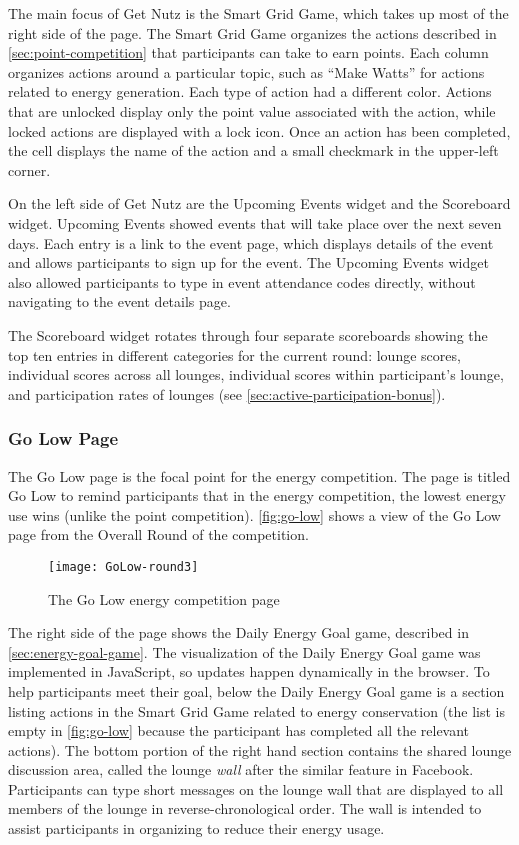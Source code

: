 The main focus of Get Nutz is the Smart Grid Game, which takes up most of the right side of the page. The Smart Grid Game organizes the actions described in \autoref{sec:point-competition} that participants can take to earn points. Each column organizes actions around a particular topic, such as ``Make Watts'' for actions related to energy generation. Each type of action had a different color. Actions that are unlocked display only the point value associated with the action, while locked actions are displayed with a lock icon. Once an action has been completed, the cell displays the name of the action and a small checkmark in the upper-left corner.

On the left side of Get Nutz are the Upcoming Events widget and the Scoreboard widget. Upcoming Events showed events that will take place over the next seven days. Each entry is a link to the event page, which displays details of the event and allows participants to sign up for the event. The Upcoming Events widget also allowed participants to type in event attendance codes directly, without navigating to the event details page.

The Scoreboard widget rotates through four separate scoreboards showing the top ten entries in different categories for the current round: lounge scores, individual scores across all lounges, individual scores within participant's lounge, and participation rates of lounges (see \autoref{sec:active-participation-bonus}).


\subsubsection{Go Low Page}

The Go Low page is the focal point for the energy competition. The page is titled Go Low to remind participants that in the energy competition, the lowest energy use wins (unlike the point competition). \autoref{fig:go-low} shows a view of the Go Low page from the Overall Round of the competition.

\begin{figure}[htbp]
	\centering
		\texttt{[image: GoLow-round3]}
		\caption{The Go Low energy competition page}
\label{fig:go-low}
\end{figure}

The right side of the page shows the Daily Energy Goal game, described in \autoref{sec:energy-goal-game}. The visualization of the Daily Energy Goal game was implemented in JavaScript, so updates happen dynamically in the browser. To help participants meet their goal, below the Daily Energy Goal game is a section listing actions in the Smart Grid Game related to energy conservation (the list is empty in \autoref{fig:go-low} because the participant has completed all the relevant actions). The bottom portion of the right hand section contains the shared lounge discussion area, called the lounge \emph{wall} after the similar feature in Facebook. Participants can type short messages on the lounge wall that are displayed to all members of the lounge in reverse-chronological order. The wall is intended to assist participants in organizing to reduce their energy usage.

